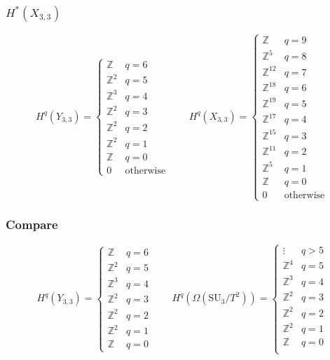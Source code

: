 \documentclass{beamer} %
\newcommand{\Z}{\mathbb{Z}}
\newcommand{\SU}{\mathrm{SU}}
\begin{document}
\begin{frame}
  \frametitle{$H^*(X_{3,3})$}
  \[ H^q(Y_{3,3}) =
  \begin{cases}
    \Z & q=6 \\
    \Z^{2} & q=5 \\
    \Z^{3} & q=4 \\
    \Z^{2} & q=3 \\
    \Z^{2} & q=2 \\
    \Z^{2} & q=1 \\
    \Z & q = 0 \\
    0 & \text{otherwise}
  \end{cases}
  \qquad 
  H^q(X_{3,3}) =
  \begin{cases}
    \Z & q = 9\\
    \Z^{5} & q = 8\\
    \Z^{12} & q = 7\\
    \Z^{18} & q = 6\\
    \Z^{19} & q = 5\\
    \Z^{17} & q = 4\\
    \Z^{15} & q = 3\\
    \Z^{11} & q = 2\\
    \Z^{5} & q = 1\\
    \Z & q = 0 \\
    0 & \text{otherwise}
  \end{cases} \]
  
\end{frame}

\begin{frame}
  \frametitle{Compare}
  \[ H^q(Y_{3,3}) =
  \begin{cases}
    \Z & q=6 \\
    \Z^{2} & q=5 \\
    \Z^{3} & q=4 \\
    \Z^{2} & q=3 \\
    \Z^{2} & q=2 \\
    \Z^{2} & q=1 \\
    \Z & q = 0
  \end{cases}
  \qquad 
  H^q(\Omega(\SU_3/T^2)) =
  \begin{cases}
    \vdots & q > 5 \\
    \Z^4 & q = 5 \\
    \Z^3 & q = 4 \\
    \Z^2 & q = 3 \\
    \Z^2 & q = 2 \\
    \Z^2 & q = 1 \\
    \Z & q = 0 \\
  \end{cases} \]

\end{frame}
\end{document}
